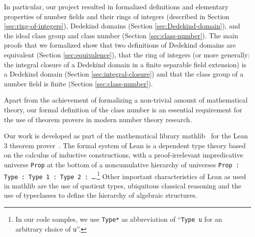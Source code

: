 \documentclass[a4paper,USenglish,cleveref, autoref, thm-restate]{lipics-v2021}
\newcommand{\lean}[1]{\texttt{#1}\xspace} %
\newcommand{\mathlib}{\textsf{mathlib}\xspace}
\begin{document}
In particular, our project resulted in formalized definitions and elementary properties of
number fields and their rings of integers (described in Section \ref{sec:ring-of-integers}),
Dedekind domains (Section \ref{sec:Dedekind-domain}),
and the ideal class group and class number (Section \ref{sec:class-number}).
The main proofs that we formalized show
that two definitions of Dedekind domains are equivalent (Section \ref{sec:equivalence}),
that the ring of integers (or more generally: the integral closure of a Dedekind domain in a finite separable field extension) is a Dedekind domain (Section \ref{sec:integral-closure})
and that the class group of a number field is finite (Section \ref{sec:class-number}).
%
%
%

Apart from the achievement of formalizing a non-trivial amount of mathematical theory,
our formal definition of the class number is an essential requirement
for the use of theorem provers in modern number theory research.

Our work is developed as part of the mathematical library \mathlib~\cite{mathlib} for the Lean 3 theorem prover~\cite{lean-prover}.
The formal system of Lean is a dependent type theory based on the calculus of inductive constructions,
with a proof-irrelevant impredicative universe \lean{Prop} at the bottom of a noncumulative hierarchy of universes \lean{Prop : Type : Type 1 : Type 2 : \dots}.\footnote{In our code samples, we use \lean{Type*} as abbreviation of ``\lean{Type u} for an arbitrary choice of \lean{u}''.}
Other important characteristics of Lean as used in \mathlib are the use of quotient types, ubiquitous classical reasoning and the use of typeclasses to define the hierarchy of algebraic structures.
\end{document}
